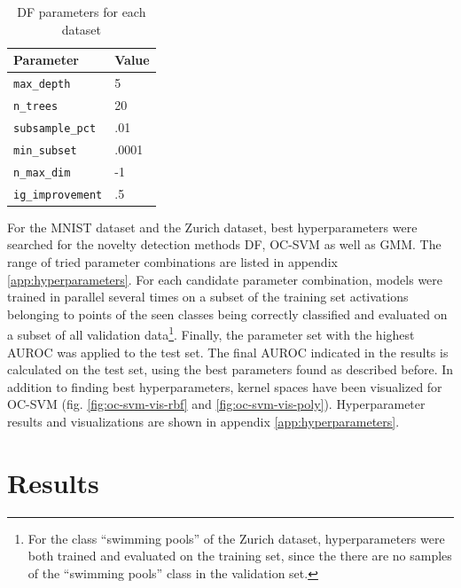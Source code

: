 \documentclass[10pt]{article}
\begin{document}
\begin{table}[H]
    \centering
    \small
    \begin{tabular}{ll}
        \toprule
        Parameter & Value \\ \midrule
        \texttt{max\_depth} & 5 \\
        \texttt{n\_trees} & 20  \\
        \texttt{subsample\_pct} & .01  \\
        \texttt{min\_subset} & .0001 \\
        \texttt{n\_max\_dim} & -1 \\
        \texttt{ig\_improvement} & .5 \\\bottomrule
    \end{tabular}
    \caption{\acrlong{DF} parameters for each dataset}
    \label{table:synthetic-parameters}
\end{table}

For the \gls{MNIST} dataset and the Zurich dataset, best hyperparameters were searched for the novelty detection methods \acrlong{DF}, \gls{OC-SVM} as well as \gls{GMM}. The range of tried parameter combinations are listed in appendix \ref{app:hyperparameters}. For each candidate parameter combination, models were trained in parallel several times on a subset of the training set activations belonging to points of the seen classes being correctly classified and evaluated on a subset of all validation data\footnote{For the class ``swimming pools'' of the Zurich dataset, hyperparameters were both trained and evaluated on the training set, since the there are no samples of the ``swimming pools'' class in the validation set.}. Finally, the parameter set with the highest \gls{AUROC} was applied to the test set. The final AUROC indicated in the results is calculated on the test set, using the best parameters found as described before. In addition to finding best hyperparameters, kernel spaces have been visualized for \gls{OC-SVM}  (fig. \ref{fig:oc-svm-vis-rbf} and \ref{fig:oc-svm-vis-poly}). Hyperparameter results and visualizations are shown in appendix \ref{app:hyperparameters}.


\section{Results}
\end{document}
